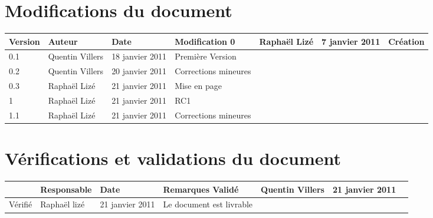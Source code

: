
\section*{Modifications du document}

\begin{center}
\begin{longtable}{|m{14mm}|m{36mm}|m{36mm}|m{60mm}|}
\hline
Version & Auteur & Date & Modification\endhead \hline
0
& %
Raphaël Lizé
& %
7 janvier 2011
& %
Création
\\\hline
0.1
& %
Quentin Villers
& %
18 janvier 2011
& %
Première Version
\\\hline
0.2
& %
Quentin Villers
& %
20 janvier 2011
& %
Corrections mineures
\\\hline
0.3
& %
Raphaël Lizé
& %
21 janvier 2011
& %
Mise en page
\\\hline
1
& %
Raphaël Lizé
& %
21 janvier 2011
& %
RC1
\\\hline
1.1
& %
Raphaël Lizé
& %
21 janvier 2011
& %
Corrections mineures
\\\hline
\end{longtable}
\end{center}


\section*{Vérifications et validations du document}

\begin{center}
\begin{longtable}{|m{15mm}|m{36mm}|m{36mm}|m{60mm}|}
\hline
 & Responsable & Date & Remarques\endhead \hline
Validé
& %
Quentin Villers
& %
21 janvier 2011
& %
\\\hline
Vérifié
& %
Raphaël lizé
& %
21 janvier 2011
& %
Le document est livrable
\\\hline
\end{longtable}
\end{center}

\pagebreak
